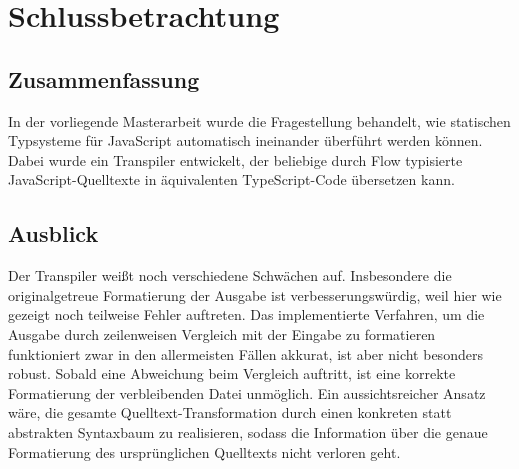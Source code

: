 \chapter{Schlussbetrachtung}
\label{chap:conclusion}

\section{Zusammenfassung}

In der vorliegende Masterarbeit wurde die Fragestellung behandelt, wie statischen Typsysteme für JavaScript automatisch ineinander überführt werden können. Dabei wurde ein Transpiler entwickelt, der beliebige durch Flow typisierte JavaScript-Quelltexte in äquivalenten TypeScript-Code übersetzen kann.

\section{Ausblick}


Der Transpiler weißt noch verschiedene Schwächen auf. Insbesondere die originalgetreue Formatierung der Ausgabe ist verbesserungswürdig, weil hier wie gezeigt noch teilweise Fehler auftreten. Das implementierte Verfahren, um die Ausgabe durch zeilenweisen Vergleich mit der Eingabe zu formatieren funktioniert zwar in den allermeisten Fällen akkurat, ist aber nicht besonders robust. Sobald eine Abweichung beim Vergleich auftritt, ist eine korrekte Formatierung der verbleibenden Datei unmöglich. Ein aussichtsreicher Ansatz wäre, die gesamte Quelltext-Transformation durch einen konkreten statt abstrakten Syntaxbaum zu realisieren, sodass die Information über die genaue Formatierung des ursprünglichen Quelltexts nicht verloren geht.

